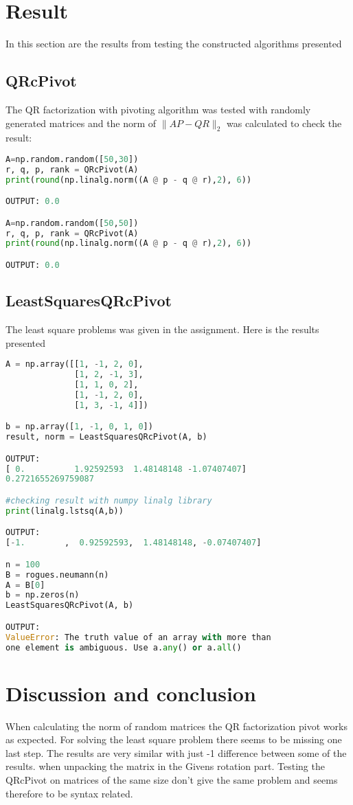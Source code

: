 \documentclass[a4paper]{article}
\begin{document}
\section{Result}
In this section are the results from testing the constructed algorithms presented
\subsection{QRcPivot}
The QR factorization with pivoting algorithm was tested with randomly generated matrices and the norm of $\|AP-QR\|_2$ was calculated to check the result:

\begin{lstlisting}[language=Python]
A=np.random.random([50,30])
r, q, p, rank = QRcPivot(A)
print(round(np.linalg.norm((A @ p - q @ r),2), 6))

OUTPUT: 0.0

A=np.random.random([50,50])
r, q, p, rank = QRcPivot(A)
print(round(np.linalg.norm((A @ p - q @ r),2), 6))

OUTPUT: 0.0
 \end{lstlisting}

\subsection{LeastSquaresQRcPivot}
The least square problems was given in the assignment. Here is the results presented
\begin{lstlisting}[language=Python]
A = np.array([[1, -1, 2, 0],
              [1, 2, -1, 3],
              [1, 1, 0, 2],
              [1, -1, 2, 0],
              [1, 3, -1, 4]])

b = np.array([1, -1, 0, 1, 0])
result, norm = LeastSquaresQRcPivot(A, b)	

OUTPUT: 
[ 0.          1.92592593  1.48148148 -1.07407407]
0.2721655269759087

#checking result with numpy linalg library
print(linalg.lstsq(A,b))

OUTPUT:
[-1.        ,  0.92592593,  1.48148148, -0.07407407]

n = 100
B = rogues.neumann(n)
A = B[0]
b = np.zeros(n)
LeastSquaresQRcPivot(A, b)

OUTPUT:
ValueError: The truth value of an array with more than 
one element is ambiguous. Use a.any() or a.all()

\end{lstlisting}


\section{Discussion and conclusion}
When calculating the norm of random matrices the QR factorization pivot works as expected. For solving the least square problem there seems to be missing one last step. The results are very similar with just -1 difference between some of the results. when unpacking the matrix in the Givens rotation part. Testing the QRcPivot on matrices of the same size don't give the same problem and seems therefore to be syntax related. 


\end{document}
